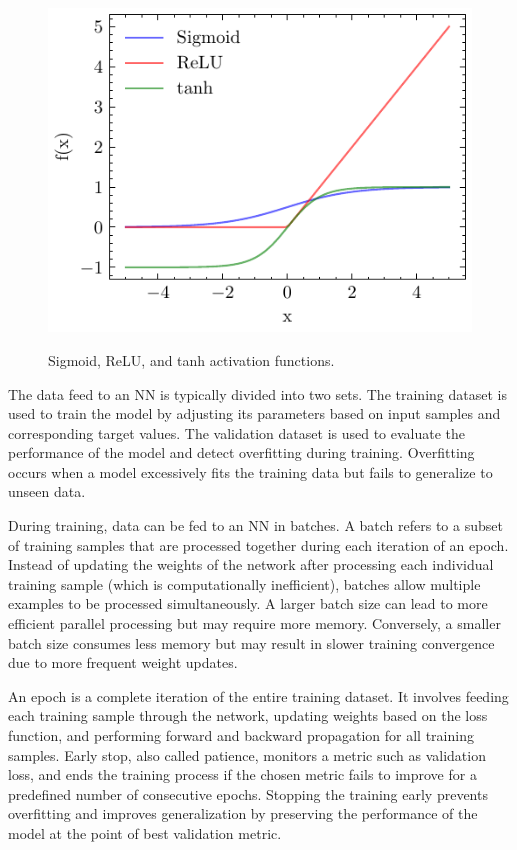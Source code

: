 \documentclass[ppgc,diss,english]{iiufrgs}
\begin{document}
\begin{figure}[tb]
\caption[Common activation functions]{Sigmoid, ReLU, and tanh activation functions.}
\vspace{\baselineskip}
\centering
\includegraphics[scale=1.0]{img/sigmoid-relu-tanh}
\label{fig:activation-functions}
\end{figure}

The data feed to an NN is typically divided into two sets. The training dataset is used to train the model by adjusting its parameters based on input samples and corresponding target values. The validation dataset is used to evaluate the performance of the model and detect overfitting during training. Overfitting occurs when a model excessively fits the training data but fails to generalize to unseen data.

During training, data can be fed to an NN in batches. A batch refers to a subset of training samples that are processed together during each iteration of an epoch. Instead of updating the weights of the network after processing each individual training sample (which is computationally inefficient), batches allow multiple examples to be processed simultaneously. A larger batch size can lead to more efficient parallel processing but may require more memory. Conversely, a smaller batch size consumes less memory but may result in slower training convergence due to more frequent weight updates.

An epoch is a complete iteration of the entire training dataset. It involves feeding each training sample through the network, updating weights based on the loss function, and performing forward and backward propagation for all training samples. Early stop, also called patience, monitors a metric such as validation loss, and ends the training process if the chosen metric fails to improve for a predefined number of consecutive epochs. Stopping the training early prevents overfitting and improves generalization by preserving the performance of the model at the point of best validation metric.
\end{document}

